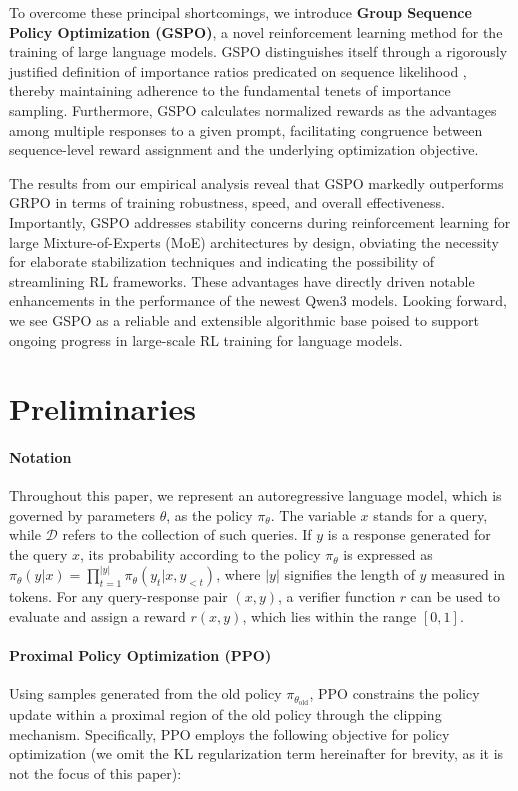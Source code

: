 To overcome these principal shortcomings, we introduce \textbf{Group Sequence Policy Optimization (GSPO)}, a novel reinforcement learning method for the training of large language models. GSPO distinguishes itself through a rigorously justified definition of importance ratios predicated on sequence likelihood \citep{click}, thereby maintaining adherence to the fundamental tenets of importance sampling. Furthermore, GSPO calculates normalized rewards as the advantages among multiple responses to a given prompt, facilitating congruence between sequence-level reward assignment and the underlying optimization objective.

The results from our empirical analysis reveal that GSPO markedly outperforms GRPO in terms of training robustness, speed, and overall effectiveness. Importantly, GSPO addresses stability concerns during reinforcement learning for large Mixture-of-Experts (MoE) architectures by design, obviating the necessity for elaborate stabilization techniques and indicating the possibility of streamlining RL frameworks. These advantages have directly driven notable enhancements in the performance of the newest Qwen3 models. Looking forward, we see GSPO as a reliable and extensible algorithmic base poised to support ongoing progress in large-scale RL training for language models.

\section{Preliminaries}

\paragraph{Notation}
Throughout this paper, we represent an autoregressive language model, which is governed by parameters $\theta$, as the policy $\pi_\theta$.
The variable $x$ stands for a query, while $\mathcal{D}$ refers to the collection of such queries. If $y$ is a response generated for the query $x$, its probability according to the policy $\pi_\theta$ is expressed as $\pi_\theta (y | x)=\prod_{t=1}^{|y|} \pi_\theta (y_t | x, y_{<t} )$, where $|y|$ signifies the length of $y$ measured in tokens. For any query-response pair $(x, y)$, a verifier function $r$ can be used to evaluate and assign a reward $r(x, y)$, which lies within the range $[ 0, 1 ]$.

\paragraph{Proximal Policy Optimization (PPO)} Using samples generated from the old policy $\pi_{\theta_\text{old}}$, PPO \citep{ppo} constrains the policy update within a proximal region of the old policy through the clipping mechanism. Specifically, PPO employs the following objective for policy optimization (we omit the KL regularization term hereinafter for brevity, as it is not the focus of this paper):

